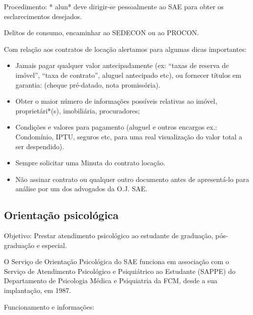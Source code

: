 Procedimento: * alun* deve dirigir-se pessoalmente ao SAE para obter os
esclarecimentos desejados.

Delitos de consumo, encaminhar ao SEDECON ou ao PROCON.

Com relação aos contratos de locação alertamos para algumas dicas importantes:

\begin{itemize}
    \item  Jamais pagar qualquer valor antecipadamente (ex: ``taxas de reserva
        de imóvel'', ``taxa de contrato'', aluguel antecipado etc), ou fornecer
        títulos em garantia: (cheque pré-datado, nota promissória).

    \item  Obter o maior número de informações possíveis relativas ao imóvel,
        proprietári*(s), imobiliária, procuradores;

    \item  Condições e valores para pagamento (aluguel e outros encargos ex.:
        Condomínio, IPTU, seguros etc, para uma real visualização do valor total
        a ser despendido).

    \item  Sempre solicitar uma Minuta do contrato locação.

    \item  Não assinar contrato ou qualquer outro documento antes de
        apresentá-lo para análise por um dos advogados da O.J. SAE.
\end{itemize}

\subsection{Orientação psicológica}

Objetivo: Prestar atendimento psicológico ao estudante de graduação, pós-graduação e
especial.

O Serviço de Orientação Psicológica do SAE funciona em associação com o Serviço
de Atendimento Psicológico e Psiquiátrico ao Estudante (SAPPE) do Departamento
de Psicologia Médica e Psiquiatria da FCM, desde a sua implantação, em 1987.

Funcionamento e informações:

